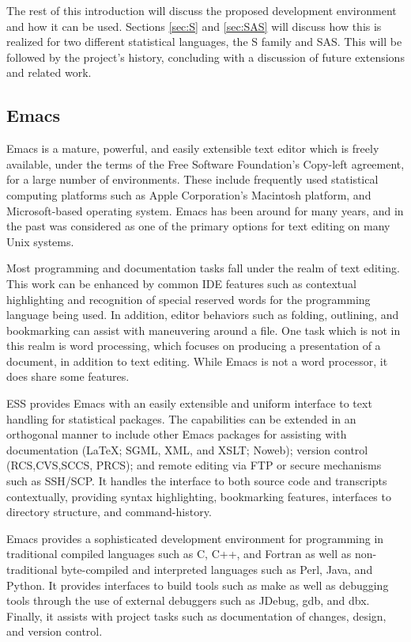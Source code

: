 \documentclass{article}
\begin{document}
The rest of this introduction will discuss the proposed development
environment and how it can be used.  Sections \ref{sec:S} and
\ref{sec:SAS} will discuss how this is realized for two different
statistical languages, the S family and SAS.  This will be followed by
the project's history, concluding with a discussion of future
extensions and related work.

\subsection{Emacs}
\label{sec:intro:emacs}

Emacs \citep{RMS:2000} is a mature, powerful, and easily extensible
text editor which is freely available, under the terms of the Free
Software Foundation's Copy-left agreement, for a large number of
environments.  These include frequently used statistical computing
platforms such as Apple Corporation's Macintosh platform, and
Microsoft-based operating system.  Emacs has been around for many
years, and in the past was considered as one of the primary options
for text editing on many Unix systems.

Most programming and documentation tasks fall under the realm of text
editing.  This work can be enhanced by common IDE features such as
contextual highlighting and recognition of special reserved words for
the programming language being used.  In addition, editor behaviors
such as folding, outlining, and bookmarking can assist with
maneuvering around a file.  One task which is not in this realm is
word processing, which focuses on producing a presentation of a
document, in addition to text editing.  While Emacs is not a word
processor, it does share some features.

ESS provides Emacs with an easily extensible and uniform interface to
text handling for statistical packages.  The capabilities can be
extended in an orthogonal manner to include other Emacs packages for
assisting with documentation (\LaTeX; SGML, XML, and XSLT; Noweb);
version control (RCS,CVS,SCCS, PRCS); and remote editing via FTP or
secure mechanisms such as SSH/SCP.  It handles the interface to both
source code and transcripts contextually, providing syntax
highlighting, bookmarking features, interfaces to directory structure,
and command-history.

Emacs provides a sophisticated development environment for programming
in traditional compiled languages such as C, C++, and Fortran as well
as non-traditional byte-compiled and interpreted languages such as
Perl, Java, and Python.  It provides interfaces to build tools such as
make as well as debugging tools through the use of external debuggers
such as JDebug, gdb, and dbx.  Finally, it assists with project tasks
such as documentation of changes, design, and version control.
\end{document}
